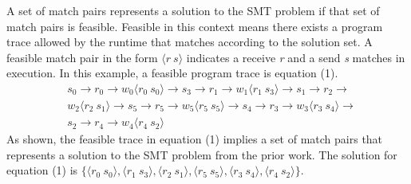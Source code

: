 A set of match pairs represents a solution to the SMT problem if that set of match pairs is feasible. 
Feasible in this context means there exists a program trace allowed by the runtime that matches according to the solution set. 
A feasible match pair in the form $\langle r\ s\rangle$ indicates a receive \textit{r} and a send \textit{s} matches in execution. 
In this example, a feasible program trace is equation (1). 
\begin{equation}
\begin{split}
& s_0\rightarrow r_0\rightarrow w_0\langle r_0\ s_0\rangle \rightarrow s_3\rightarrow r_1\rightarrow w_1\langle r_1\ s_3\rangle \rightarrow s_1\rightarrow r_2 \rightarrow\\
&  w_2\langle r_2\ s_1\rangle \rightarrow s_5\rightarrow r_5\rightarrow w_5\langle r_5\ s_5\rangle \rightarrow s_4\rightarrow r_3\rightarrow w_3\langle r_3\ s_4\rangle \rightarrow\\
&  s_2\rightarrow r_4\rightarrow w_4\langle r_4\ s_2\rangle
\end{split}
\end{equation} 
As shown, the feasible trace in equation (1) implies a set of match pairs that represents a solution to the SMT problem from the prior work. The solution for equation (1) is $\{\langle r_0\ s_0\rangle, \langle r_1\ s_3\rangle, \langle r_2\ s_1\rangle, \langle r_5\ s_5\rangle, \langle r_3\ s_4\rangle, \langle r_4\ s_2\rangle\}$.



